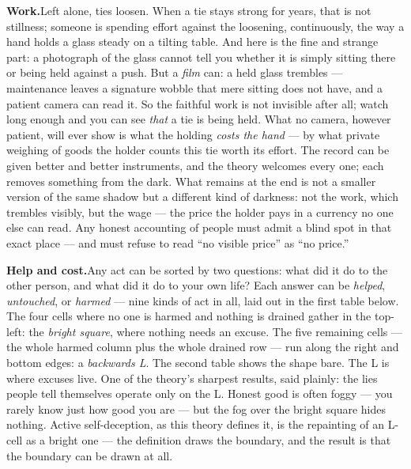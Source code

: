 \textbf{Work.}\enspace Left alone, ties loosen. When a tie stays strong for years, that is not stillness; someone is spending effort against the loosening, continuously, the way a hand holds a glass steady on a tilting table. And here is the fine and strange part: a photograph of the glass cannot tell you whether it is simply sitting there or being held against a push. But a \emph{film} can: a held glass trembles --- maintenance leaves a signature wobble that mere sitting does not have, and a patient camera can read it. So the faithful work is not invisible after all; watch long enough and you can see \emph{that} a tie is being held. What no camera, however patient, will ever show is what the holding \emph{costs the hand} --- by what private weighing of goods the holder counts this tie worth its effort. The record can be given better and better instruments, and the theory welcomes every one; each removes something from the dark. What remains at the end is not a smaller version of the same shadow but a different kind of darkness: not the work, which trembles visibly, but the wage --- the price the holder pays in a currency no one else can read. Any honest accounting of people must admit a blind spot in that exact place --- and must refuse to read ``no visible price'' as ``no price.''

\textbf{Help and cost.}\enspace Any act can be sorted by two questions: what did it do to the other person, and what did it do to your own life? Each answer can be \emph{helped}, \emph{untouched}, or \emph{harmed} --- nine kinds of act in all, laid out in the first table below. The four cells where no one is harmed and nothing is drained gather in the top-left: the \emph{bright square}, where nothing needs an excuse. The five remaining cells --- the whole harmed column plus the whole drained row --- run along the right and bottom edges: a \emph{backwards L}. The second table shows the shape bare. The L is where excuses live. One of the theory's sharpest results, said plainly: the lies people tell themselves operate only on the L. Honest good is often foggy --- you rarely know just how good you are --- but the fog over the bright square hides nothing. Active self-deception, as this theory defines it, is the repainting of an L-cell as a bright one --- the definition draws the boundary, and the result is that the boundary can be drawn at all.
